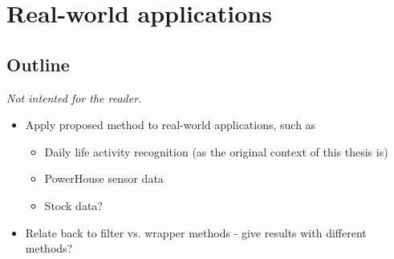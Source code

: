 
\chapter{Real-world applications}

\label{Chapter6} %


\section{Outline}
\emph{Not intented for the reader.}
\begin{itemize}
  \item Apply proposed method to real-world applications, such as
    \begin{itemize}
      \item Daily life activity recognition (as the original context of this thesis is)
      \item PowerHouse sensor data
      \item Stock data?
    \end{itemize}
  \item Relate back to filter vs. wrapper methods - give results with different methods?
\end{itemize}


